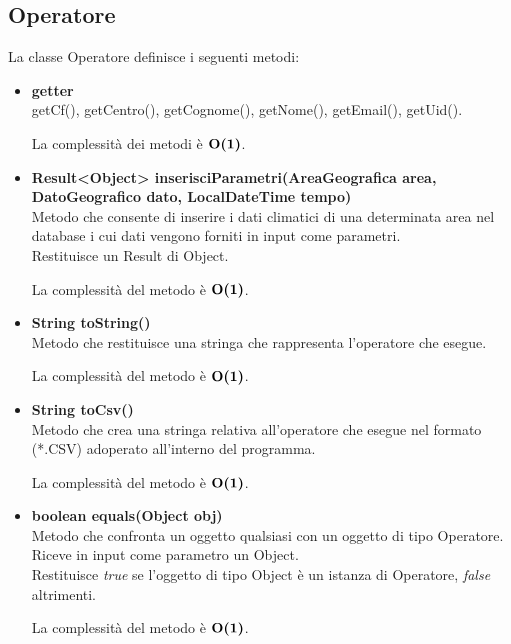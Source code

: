 \documentclass[a4paper, 12pt]{scrreprt}
\begin{document}
			\subsection{Operatore}
			La classe Operatore definisce i seguenti metodi:\\
			\begin{itemize}
				\item \textbf{getter}
				\\getCf(), getCentro(), getCognome(), getNome(), getEmail(), getUid().
				
				La complessit\`a dei metodi \`e $\mathbf{O}\textbf{(1)}$.
				
				\item \textbf{Result<Object> inserisciParametri(AreaGeografica area, DatoGeografico dato, LocalDateTime tempo)}
				\\Metodo che consente di inserire i dati climatici di una determinata area nel database i cui dati vengono forniti in input come parametri.
				\\Restituisce un Result di Object.
				
				La complessit\`a del metodo \`e $\mathbf{O}\textbf{(1)}$.
				
				\item \textbf{String toString()}
				\\Metodo che restituisce una stringa che rappresenta l'operatore che esegue.
				
				La complessit\`a del metodo \`e $\mathbf{O}\textbf{(1)}$.
				
				\item \textbf{String toCsv()}
				\\Metodo che crea una stringa relativa all'operatore che esegue nel formato (*.CSV) adoperato all'interno del programma.
				
				La complessit\`a del metodo \`e $\mathbf{O}\textbf{(1)}$.
				
				\item \textbf{boolean equals(Object obj)}
				\\Metodo che confronta un oggetto qualsiasi con un oggetto di tipo Operatore.
				\\Riceve in input come parametro un Object.
				\\Restituisce \textit{true} se l'oggetto di tipo Object \`e un istanza di Operatore, \textit{false} altrimenti.
				
				La complessit\`a del metodo \`e $\mathbf{O}\textbf{(1)}$.
				
			\end{itemize}
\end{document}
